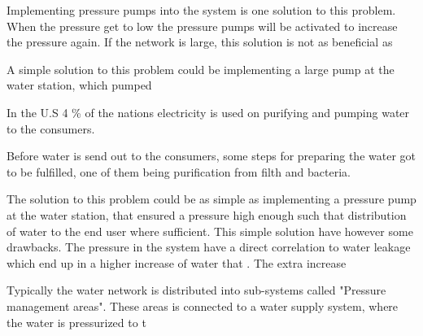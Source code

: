 Implementing pressure pumps into the system is one solution to this problem. When the pressure get to low the pressure pumps will be activated to increase the pressure again. If the network is large, this solution is not as beneficial as 

A simple solution to this problem could be implementing a large pump at the water station, which pumped

In the U.S 4 \% of the nations electricity is used on purifying and pumping water to the consumers. 

Before water is send out to the consumers, some steps for preparing the water got to be fulfilled, one of them being purification from filth and bacteria.  




The solution to this problem could be as simple as implementing a pressure pump at the water station, that ensured a pressure high enough such that distribution of water to the end user where sufficient. This simple solution have however some drawbacks. The pressure in the system have a direct correlation to water leakage which end up in a higher increase of water that . The extra increase 


Typically the water network is distributed into sub-systems called "Pressure management areas". These areas is connected to a water supply system, where the water is pressurized to t  





